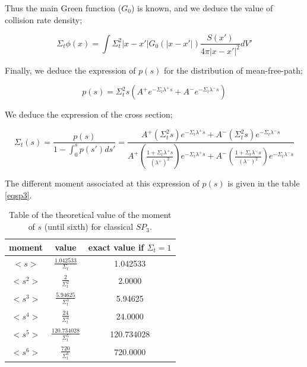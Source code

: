 \documentclass[a4paper, 12pt]{report}
\newcommand{\bl}{\big<}
\newcommand{\bg}{\big>}
\begin{document}
Thus the main Green function ($G_0$) is known, and we deduce the value of collision rate density;

\begin{equation}
\Sigma_t \phi(x) = \int \Sigma_t^2 |x-x'| G_0(|x-x'|)\frac{S(x')}{4\pi |x-x'|^2}dV'
\end{equation}

Finally, we deduce the expression of $p(s)$ for the distribution of mean-free-path;

\begin{equation}
p(s) = \Sigma_t^2s \left(A^+ e^{-\Sigma_t \lambda^+ s} + A^- e^{-\Sigma_t \lambda^- s}  \right)
\end{equation}

We deduce the expression of the cross section;

\begin{equation}
\Sigma_t(s) = \frac{p(s)}{1-\int_0^sp(s')ds'} = \frac{A^+(\Sigma_t^2s)e^{-\Sigma_t \lambda^+ s} + A^-(\Sigma_t^2s)e^{-\Sigma_t \lambda^- s} }{A^+(\frac{1+\Sigma_t\lambda^+s}{(\lambda^+)^2})e^{-\Sigma_t \lambda^+ s} + A^-(\frac{1+\Sigma_t\lambda^-s}{(\lambda^-)^2})e^{-\Sigma_t \lambda^- s}}
\end{equation}

The different moment associated at this expression of $p(s)$ is given in the table \ref{eqsp3}.

\begin{center}
\begin{table}
\begin{center}
\begin{tabular}{|c|c|c|}
\hline
moment & value & exact value if $\Sigma_t = 1$ \\ \hline
$\bl s \bg$ &$ \frac{1.042533}{\Sigma_t}$ & 1.042533  \\ \hline
$\bl s^2 \bg$ & $\frac{2}{\Sigma_t^2}$ & 2.0000 \\ \hline
$\bl s^3 \bg$ &$ \frac{5.94625}{\Sigma_t^3}$ & 5.94625\\ \hline
$\bl s^4 \bg$ &$ \frac{24}{ \Sigma_t^4}$ & 24.0000\\ \hline
$\bl s^5 \bg$ &$ \frac{120.734028}{\Sigma_t^5}$ & 120.734028 \\ \hline
$\bl s^6 \bg$ &$ \frac{720}{ \Sigma_t^6}$ & 720.0000 \\ \hline
\end{tabular}
\caption{\label{momentsp3} Table of the theoretical value of the moment of $s$ (until sixth) for classical $SP_3$. }
\end{center}
\end{table}
\end{center}
\end{document}
